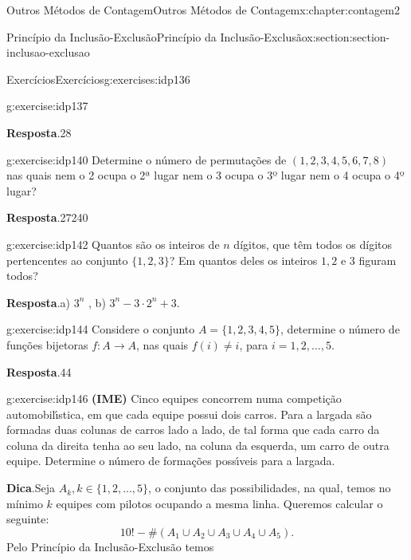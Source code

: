\documentclass[oneside,10pt,]{book}
\newcommand{\blocktitlefont}{\relax}
\newcommand{\terminology}[1]{\textbf{#1}}
\numberwithin{equation}{section}
\begin{document}
\begin{chapterptx}{Outros Métodos de Contagem}{}{Outros Métodos de Contagem}{}{}{x:chapter:contagem2}
\begin{sectionptx}{Princípio da Inclusão-Exclusão}{}{Princípio da Inclusão-Exclusão}{}{}{x:section:section-inclusao-exclusao}
\begin{exercises-subsection}{Exercícios}{}{Exercícios}{}{}{g:exercises:idp136}
\begin{divisionexercise}{1}{}{}{g:exercise:idp137}
\par\smallskip%
\noindent\textbf{\blocktitlefont Resposta}.\hypertarget{g:answer:idp139}{}\quad{}28%
\end{divisionexercise}%
\begin{divisionexercise}{2}{}{}{g:exercise:idp140}%
Determine o número de permutações de \((1, 2, 3, 4, 5, 6, 7, 8)\) nas quais nem o 2 ocupa o 2ª lugar nem o 3 ocupa o 3º lugar nem o 4 ocupa o 4º lugar?%
\par\smallskip%
\noindent\textbf{\blocktitlefont Resposta}.\hypertarget{g:answer:idp141}{}\quad{}27240%
\end{divisionexercise}%
\begin{divisionexercise}{3}{}{}{g:exercise:idp142}%
Quantos são os inteiros de \(n\) dígitos, que têm todos os dígitos pertencentes ao conjunto \(\{1, 2, 3\}\)? Em quantos deles os inteiros \(1, 2\) e \(3\) figuram todos?%
\par\smallskip%
\noindent\textbf{\blocktitlefont Resposta}.\hypertarget{g:answer:idp143}{}\quad{}a) \(3^n\) , b) \(3^n-3\cdot 2^n+3\).%
\end{divisionexercise}%
\begin{divisionexercise}{4}{}{}{g:exercise:idp144}%
Considere o conjunto \(A=\{1, 2, 3, 4, 5\}\), determine o número de funções bijetoras \(f:A\rightarrow A\), nas quais \(f(i)\neq i\), para \(i=1, 2, \ldots, 5\).%
\par\smallskip%
\noindent\textbf{\blocktitlefont Resposta}.\hypertarget{g:answer:idp145}{}\quad{}44%
\end{divisionexercise}%
\begin{divisionexercise}{5}{}{}{g:exercise:idp146}%
\terminology{(IME)} Cinco equipes concorrem numa competição automobilı́stica, em que cada equipe possui dois carros. Para a largada são formadas duas colunas de carros lado a lado, de tal forma que cada carro da coluna da direita tenha ao seu lado, na coluna da esquerda, um carro de outra equipe. Determine o número de formações possı́veis para a largada.%
\par\smallskip%
\noindent\textbf{\blocktitlefont Dica}.\hypertarget{g:hint:idp147}{}\quad{}Seja \(A_k, k\in\{1, 2, \ldots, 5\} \), o conjunto das possibilidades, na qual, temos no mínimo \(k\) equipes com pilotos ocupando a mesma linha. Queremos calcular o seguinte:%
%
\begin{equation*}
10! - \#(A_1\cup A_2\cup A_3\cup A_4\cup A_5).
\end{equation*}
Pelo Princípio da Inclusão-Exclusão temos%
%
\begin{align*}

\end{align*}
\end{divisionexercise}
\end{exercises-subsection}
\end{sectionptx}
\end{chapterptx}
\end{document}
